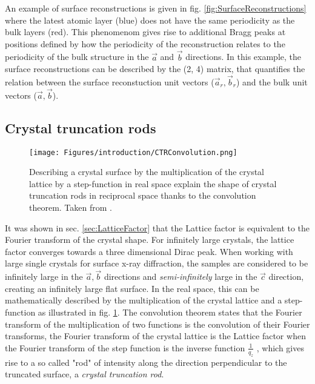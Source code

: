 An example of surface reconstructions is given in fig. \ref{fig:SurfaceReconstructions} where the latest atomic layer (blue) does not have the same periodicity as the bulk layers (red).
This phenomenom gives rise to additional Bragg peaks at positions defined by how the periodicity of the reconstruction relates to the periodicity of the bulk structure in the $\vec{a}$ and $\vec{b}$ directions.
In this example, the surface reconstructions can be described by the (2, 4) matrix, that quantifies the relation between the surface reconstuction unit vectors ($\vec{a}_r, \vec{b}_r$) and the bulk unit vectors ($\vec{a}, \vec{b}$).

\subsection{Crystal truncation rods} \label{sec:CTR}

\begin{figure}[!htb]
    \centering
    \texttt{[image: Figures/introduction/CTRConvolution.png]}
    \caption{
    Describing a crystal surface by the multiplication of the crystal lattice by a step-function in real space explain the shape of crystal truncation rods in reciprocal space thanks to the convolution theorem.
    Taken from \cite{Willmott}.
    }
    \label{fig:CTRConvolution}
\end{figure}

It was shown in sec. \ref{sec:LatticeFactor} that the Lattice factor is equivalent to the Fourier transform of the crystal shape.
For infinitely large crystals, the lattice factor converges towards a three dimensional Dirac peak.
When working with large single crystals for surface x-ray diffraction, the samples are considered to be infinitely large in the $\vec{a}, \vec{b}$ directions and \textit{semi-infinitely} large in the $\vec{c}$ direction, creating an infinitely large flat surface.
In the real space, this can be mathematically described by the multiplication of the crystal lattice and a step-function as illustrated in fig. \ref{fig:CTRConvolution}.
The convolution theorem states that the Fourier transform of the multiplication of two functions is the convolution of their Fourier transforms, the Fourier transform of the crystal lattice is the Lattice factor when the Fourier transform of the step function is the inverse function $\frac{1}{q_z}$ \parencite{Andrews1985, Robinson1986}, which gives rise to a so called "rod" of intensity along the direction perpendicular to the truncated surface, a \textit{crystal truncation rod}.

